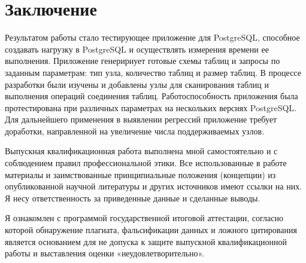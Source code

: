 \chapter*{Заключение}

Результатом работы стало тестирующее приложение для PostgreSQL, способное создавать нагрузку в PostgreSQL и осуществлять измерения времени ее выполнения. Приложение генеририует готовые схемы таблиц и запросы по заданным параметрам: тип узла, количество таблиц и размер таблиц. В процессе разработки были изучены и добавлены узлы для сканирования таблиц и выполнения операций соединения таблиц. Работоспособность приложения была протестирована при различных параметрах на нескольких версиях PostgreSQL.  Для дальнейшего применения в выявлении регрессий приложение требует доработки, направленной на увеличение числа поддерживаемых узлов.

Выпускная квалификационная работа выполнена мной самостоятельно и с соблюдением правил профессиональной этики. Все использованные в работе материалы и заимствованные принципиальные положения (концепции) из опубликованной научной литературы и других источников имеют ссылки на них. Я несу ответственность за приведенные данные и сделанные выводы.

Я ознакомлен с программой государственной итоговой аттестации, согласно которой обнаружение плагиата, фальсификации данных и ложного цитирования является основанием для не допуска к защите выпускной квалификационной работы и выставления оценки «неудовлетворительно».


\begin{center}
	\begin{minipage}[b]{0.35\textwidth}
		\studentfiotemplate
	\end{minipage}
	\hspace{25mm}
	\begin{minipage}[b]{0.35\textwidth}
        \studentsigntemplate
	\end{minipage}
\end{center}

\begin{minipage}{0.35\textwidth}
        \vspace{1.02cm}
        \studentdatetemplate
\end{minipage}

